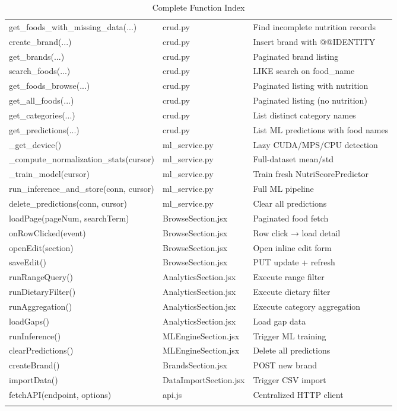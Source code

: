 \documentclass[12pt,a4paper]{article}
\begin{document}
\begin{longtable}{p{4.8cm}p{3.5cm}p{7.2cm}}
get\_foods\_with\_missing\_data(...) & crud.py & Find incomplete nutrition records \\
create\_brand(...) & crud.py & Insert brand with @@IDENTITY \\
get\_brands(...) & crud.py & Paginated brand listing \\
search\_foods(...) & crud.py & LIKE search on food\_name \\
get\_foods\_browse(...) & crud.py & Paginated listing with nutrition \\
get\_all\_foods(...) & crud.py & Paginated listing (no nutrition) \\
get\_categories(...) & crud.py & List distinct category names \\
get\_predictions(...) & crud.py & List ML predictions with food names \\
\midrule
\_get\_device() & ml\_service.py & Lazy CUDA/MPS/CPU detection \\
\_compute\_normalization\_stats(cursor) & ml\_service.py & Full-dataset mean/std \\
\_train\_model(cursor) & ml\_service.py & Train fresh NutriScorePredictor \\
run\_inference\_and\_store(conn, cursor) & ml\_service.py & Full ML pipeline \\
delete\_predictions(conn, cursor) & ml\_service.py & Clear all predictions \\
\midrule
loadPage(pageNum, searchTerm) & BrowseSection.jsx & Paginated food fetch \\
onRowClicked(event) & BrowseSection.jsx & Row click → load detail \\
openEdit(section) & BrowseSection.jsx & Open inline edit form \\
saveEdit() & BrowseSection.jsx & PUT update + refresh \\
runRangeQuery() & AnalyticsSection.jsx & Execute range filter \\
runDietaryFilter() & AnalyticsSection.jsx & Execute dietary filter \\
runAggregation() & AnalyticsSection.jsx & Execute category aggregation \\
loadGaps() & AnalyticsSection.jsx & Load gap data \\
runInference() & MLEngineSection.jsx & Trigger ML training \\
clearPredictions() & MLEngineSection.jsx & Delete all predictions \\
createBrand() & BrandsSection.jsx & POST new brand \\
importData() & DataImportSection.jsx & Trigger CSV import \\
fetchAPI(endpoint, options) & api.js & Centralized HTTP client \\
\bottomrule
\caption{Complete Function Index}
\end{longtable}
\end{document}
